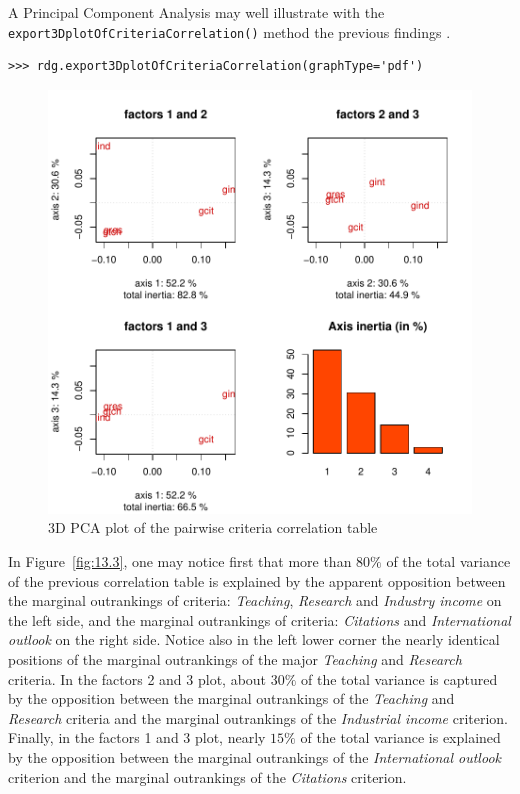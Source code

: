 A Principal Component Analysis may well illustrate with the \texttt{export3Dplot\-OfCriteriaCorrelation()} method the previous findings \citep[Lecture 2]{CPSTAT-2020}. 
\begin{lstlisting}
>>> rdg.export3DplotOfCriteriaCorrelation(graphType='pdf')
\end{lstlisting}
\begin{figure}[ht]
\includegraphics[width=\hsize]{Figures/13-3-3DCorrelation.pdf}
\caption{3D PCA plot of the pairwise criteria correlation table}
\label{fig:13.3}       %
\end{figure}

In Figure~\vref{fig:13.3}, one may notice first that more than $80\%$ of the total variance of the previous correlation table is explained by the apparent opposition between the marginal outrankings of criteria: \emph{Teaching}, \emph{Research} and \emph{Industry income} on the left side, and the marginal outrankings of criteria: \emph{Citations} and \emph{International outlook} on the right side. Notice also in the left lower corner the nearly identical positions of the marginal outrankings of the major \emph{Teaching} and \emph{Research} criteria. In the factors 2 and 3 plot, about $30\%$ of the total variance is captured by the opposition between the marginal outrankings of the \emph{Teaching} and \emph{Research} criteria and the marginal outrankings of the \emph{Industrial income} criterion. Finally, in the factors 1 and 3 plot, nearly $15\%$ of the total variance is explained by the opposition between the marginal outrankings of the \emph{International outlook} criterion and the marginal outrankings of the \emph{Citations} criterion.

